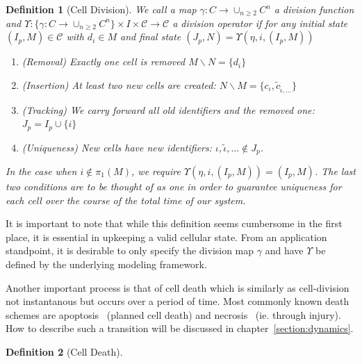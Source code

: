 \documentclass{article}
\newcommand{\todo}[1]{\colorbox{WildStrawberry}{\textcolor{white}{#1}}}
\newtheorem{definition}{Definition}[section]
\begin{document}
\begin{definition}[Cell Division]
    \label{definition:cell-division}
    We call a map $\gamma:C\rightarrow \cup_{n\geq 2}C^n$ a division function and
    $\Upsilon:\{\gamma:C\rightarrow \cup_{n\geq 2}C^n\}\times I\times\mathscr{C}\rightarrow\mathscr{C}$ a 
    division operator if for any initial state $(I_p,M)\in\mathscr{C}$ with $d_i\in M$ and final
    state $(J_p,N)=\Upsilon(\eta,i,(I_p,M))$
    \begin{enumerate}
        \item (Removal) Exactly one cell is removed $M\backslash N=\{d_i\}$
        \item (Insertion) At least two new cells are created:
            $N\backslash M=\{c_\iota,\tilde{c}_{\tilde{\iota},\dots}\}$
        \item (Tracking) We carry forward all old identifiers and the removed one: $J_p=I_p\cup\{i\}$
        \item (Uniqueness) New cells have new identifiers: $\iota,\tilde{\iota},\dots\notin J_p$.
    \end{enumerate}
    In the case when $i\notin\pi_1(M)$, we require $\Upsilon(\eta,i,(I_p,M))=(I_p,M)$.
    The last two conditions are to be thought of as one in order to guarantee uniqueness for each
    cell over the course of the total time of our system.
\end{definition}

It is important to note that while this definition seems cumbersome in the first place, it is
essential in upkeeping a valid cellular state.
From an application standpoint, it is desirable to only specify the division map $\gamma$ and have
$\Upsilon$ be defined by the underlying modeling framework.

Another important process is that of cell death which is similarly as cell-division not instantanous
but occurs over a period of time.
Most commonly known death schemes are apoptosis~\cite{Kerr1965} (planned cell death) and
necrosis~\cite{Gerschenson2001} (ie. through injury).
How to describe such a transition will be discussed in chapter~\ref{section:dynamics}.

\begin{definition}[Cell Death]
\todo{
    - apoptosis
    - necrosis
    - removal
}
\end{definition}
\end{document}
